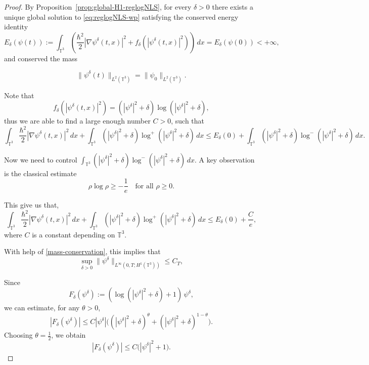 \documentclass[11pt]{article}
\begin{document}
\begin{proof}
By Proposition~\ref{prop:global-H1-reglogNLS}, for every \(\delta>0\) there exists a unique global solution to \eqref{eq:reglogNLS-wp} satisfying the conserved energy identity
\[
E_\delta(\psi(t))
:=
\int_{\mathbb{T}^3}
\left(
\frac{\hbar^2}{2}|\nabla\psi^\delta(t,x)|^2
+
f_\delta(|\psi^\delta(t,x)|^2)
\right)\,dx
=
E_\delta(\psi(0))<+\infty,
\]
and conserved the mass

\begin{equation}\label{mass-conservation}
\|\psi^\delta(t)\|_{L^2(\mathbb{T}^3)}
=
\|\psi_0\|_{L^2(\mathbb{T}^3)}.
\end{equation}








Note that $$ f_\delta(|\psi^\delta(t,x)|^2)=(|\psi^{\delta}|^2+\delta)\log (|\psi^\delta|^2+\delta),$$
thus we are able to find a large enough number $C>0$, such that 
\[\int_{\mathbb{T}^3}
\frac{\hbar^2}{2}|\nabla\psi^\delta(t,x)|^2
\,dx+\int_{\mathbb{T}^3}(|\psi^{\delta}|^2+\delta)\log^+ (|\psi^\delta|^2+\delta)\,dx
\leq E_{\delta}(0)+\int_{\mathbb{T}^3}(|\psi^{\delta}|^2+\delta)\log^- (|\psi^\delta|^2+\delta)\,dx.
\]

Now we need to control $\int_{\mathbb{T}^3}(|\psi^{\delta}|^2+\delta)\log^- (|\psi^\delta|^2+\delta)\,dx$.
A key observation is the classical estimate
\[
\rho \log \rho \ge -\frac{1}{e} \quad \text{for all } \rho \ge 0.
\]

This give us that, 
 \[\int_{\mathbb{T}^3}
\frac{\hbar^2}{2}|\nabla\psi^\delta(t,x)|^2
\,dx+\int_{\mathbb{T}^3}(|\psi^{\delta}|^2+\delta)\log^+ (|\psi^\delta|^2+\delta)\,dx
\leq E_{\delta}(0)+\frac{C}{e},
\]where $C$ is a constant depending on $\mathbb{T}^3$.

With help of \eqref{mass-conservation}, this implies that \begin{equation}
\label{H1 bound}
\sup_{\delta>0} \|\psi^\delta\|_{L^\infty(0,T; H^1(\mathbb{T}^3))} \le C_T,
\end{equation}
\smallskip





Since 
\[
F_\delta(\psi^\delta) := (\log(|\psi^\delta|^2 + \delta) + 1) \, \psi^\delta,
\]
we can estimate, for any $\theta > 0$,
\[
|F_\delta(\psi^\delta)| \le C |\psi^\delta| \big( (|\psi^\delta|^2 + \delta)^\theta + (|\psi^\delta|^2 + \delta)^{1-\theta} \big).
\]
Choosing $\theta = \frac{1}{2}$, we obtain
\[
|F_\delta(\psi^\delta)| \le C \big( |\psi^\delta|^2 + 1 \big).
\]


\end{proof}
\end{document}
